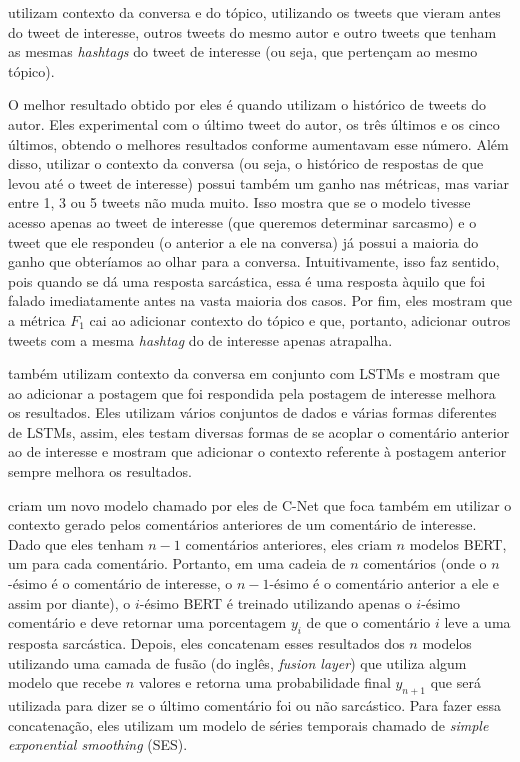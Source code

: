 \cite{wang-etal:2015:context-twitter} utilizam contexto da conversa e do tópico,
utilizando os tweets que vieram antes do tweet de interesse, outros tweets do
mesmo autor e outro tweets que tenham as mesmas \textit{hashtags} do tweet de
interesse (ou seja, que pertençam ao mesmo tópico).

O melhor resultado obtido por eles é quando utilizam o histórico de tweets do
autor. Eles experimental com o último tweet do autor, os três últimos e os cinco
últimos, obtendo o melhores resultados conforme aumentavam esse número. Além
disso, utilizar o contexto da conversa (ou seja, o histórico de respostas de que
levou até o tweet de interesse) possui também um ganho nas métricas, mas variar
entre 1, 3 ou 5 tweets não muda muito. Isso mostra que se o modelo tivesse
acesso apenas ao tweet de interesse (que queremos determinar sarcasmo) e o tweet
que ele respondeu (o anterior a ele na conversa) já possui a maioria do ganho
que obteríamos ao olhar para a conversa. Intuitivamente, isso faz sentido, pois
quando se dá uma resposta sarcástica, essa é uma resposta àquilo que foi falado
imediatamente antes na vasta maioria dos casos. Por fim, eles mostram que a
métrica $F_1$ cai ao adicionar contexto do tópico e que, portanto, adicionar
outros tweets com a mesma \textit{hashtag} do de interesse apenas atrapalha.

\cite{ghosh:2018:sarcasm-conversation-context} também utilizam contexto da
conversa em conjunto com LSTMs e mostram que ao adicionar a postagem que foi
respondida pela postagem de interesse melhora os resultados. Eles utilizam
vários conjuntos de dados e várias formas diferentes de LSTMs, assim, eles
testam diversas formas de se acoplar o comentário anterior ao de interesse e
mostram que adicionar o contexto referente à postagem anterior sempre melhora os
resultados.

\cite{jena-etal:2020:cnet} criam um novo modelo chamado por eles de C-Net que
foca também em utilizar o contexto gerado pelos comentários anteriores de um
comentário de interesse. Dado que eles tenham $n-1$ comentários anteriores, eles
criam $n$ modelos BERT, um para cada comentário. Portanto, em uma cadeia de $n$
comentários (onde o $n$-ésimo é o comentário de interesse, o $n-1$-ésimo é o
comentário anterior a ele e assim por diante), o $i$-ésimo BERT é treinado
utilizando apenas o $i$-ésimo comentário e deve retornar uma porcentagem $y_i$
de que o comentário $i$ leve a uma resposta sarcástica. Depois, eles concatenam
esses resultados dos $n$ modelos utilizando uma camada de fusão (do inglês,
\textit{fusion layer}) que utiliza algum modelo que recebe $n$ valores e retorna
uma probabilidade final $y_{n+1}$ que será utilizada para dizer se o último
comentário foi ou não sarcástico. Para fazer essa concatenação, eles utilizam
um modelo de séries temporais chamado de \textit{simple exponential smoothing}
(SES).

